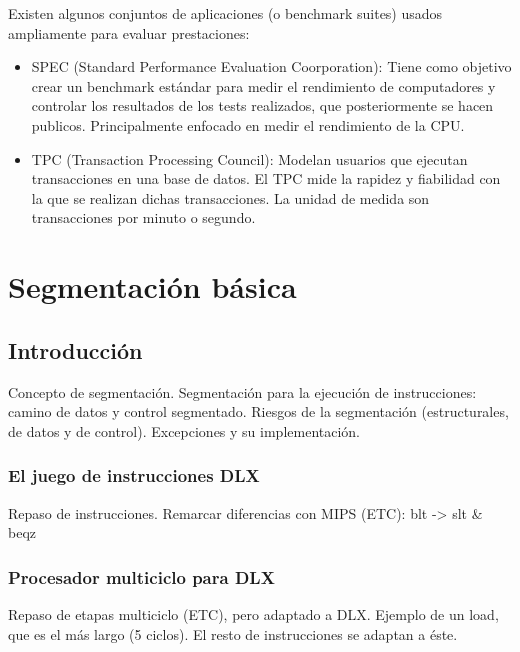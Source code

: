 \documentclass[12pt,onecolumn]{memoir}
\begin{document}
Existen algunos conjuntos de aplicaciones (o benchmark suites) usados ampliamente para evaluar
prestaciones:

\begin{itemize}

\item SPEC (Standard Performance Evaluation Coorporation): Tiene como
  objetivo crear un benchmark estándar para medir el rendimiento de
  computadores y controlar los resultados de los tests realizados, que
  posteriormente se hacen publicos. Principalmente enfocado en medir
  el rendimiento de la CPU.

\item TPC (Transaction Processing Council): Modelan usuarios que
  ejecutan transacciones en una base de datos. El TPC mide la rapidez
  y fiabilidad con la que se realizan dichas transacciones. La unidad
  de medida son transacciones por minuto o segundo.

\end{itemize}


\chapter{Segmentación básica}
\label{cap:segmentado}


\section{Introducción}
\label{sec:introduccion_segmentado}

Concepto de segmentación. Segmentación para la ejecución de
instrucciones: camino de datos y control segmentado. Riesgos de la
segmentación (estructurales, de datos y de control). Excepciones y su
implementación.

\subsection{El juego de instrucciones DLX}

Repaso de instrucciones. Remarcar diferencias con MIPS (ETC): blt -> slt \& beqz

\subsection{Procesador multiciclo para DLX}

Repaso de etapas multiciclo (ETC), pero adaptado a DLX. Ejemplo de
un load, que es el más largo (5 ciclos). El resto de instrucciones se adaptan a éste. 
\end{document}
